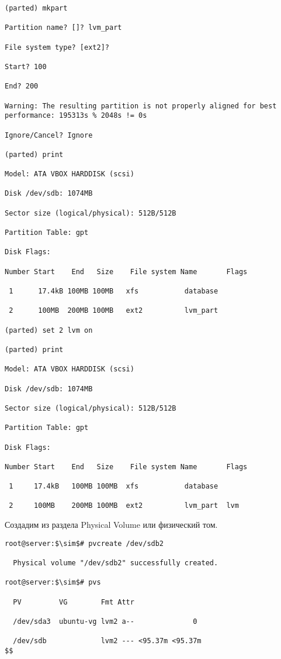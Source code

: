 \documentclass[14pt, a4paper]{article}
\begin{document}
\begin{lstlisting}
(parted) mkpart

Partition name? []? lvm_part

File system type? [ext2]?

Start? 100

End? 200

Warning: The resulting partition is not properly aligned for best 
performance: 195313s % 2048s != 0s

Ignore/Cancel? Ignore

(parted) print

Model: ATA VBOX HARDDISK (scsi)

Disk /dev/sdb: 1074MB

Sector size (logical/physical): 512B/512B

Partition Table: gpt

Disk Flags:

Number Start    End   Size    File system Name       Flags

 1      17.4kB 100MB 100MB   xfs           database

 2      100MB  200MB 100MB   ext2          lvm_part

(parted) set 2 lvm on

(parted) print

Model: ATA VBOX HARDDISK (scsi)

Disk /dev/sdb: 1074MB

Sector size (logical/physical): 512B/512B

Partition Table: gpt

Disk Flags:

Number Start    End   Size    File system Name       Flags

 1     17.4kB   100MB 100MB  xfs           database

 2     100MB    200MB 100MB  ext2          lvm_part  lvm

\end{lstlisting}

\newpage

Создадим из раздела Physical Volume или физический том.
\vspace{0.3cm}

\begin{lstlisting}[mathescape=true]
root@server:$\sim$# pvcreate /dev/sdb2

  Physical volume "/dev/sdb2" successfully created.

root@server:$\sim$# pvs

  PV         VG        Fmt Attr

  /dev/sda3  ubuntu-vg lvm2 a--              0

  /dev/sdb             lvm2 --- <95.37m <95.37m
$$
\end{lstlisting}
\vspace{0.2cm}
\end{document}
